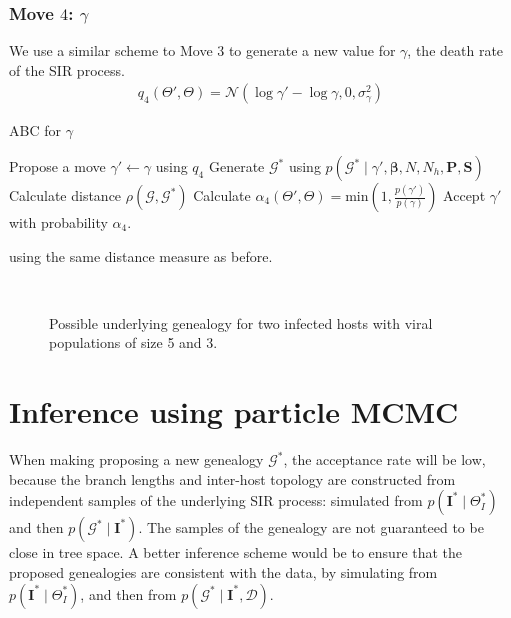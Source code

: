 \documentclass[a4paper,18pt]{report}
\begin{document}
\subsubsection{Move $4$: $\gamma$}
We use a similar scheme to Move $3$ to generate a new value for $\gamma$, the death rate of the SIR process.
\begin{eqnarray}
q_4(\Theta',\Theta)= \mathcal{N}(\log \gamma' - \log \gamma, 0 , \sigma_{\gamma}^2)
\end{eqnarray}
\begin{algorithm}
\caption{ABC for $\gamma$ \label{alg:gamma}}
\begin{algorithmic}
\STATE Propose a move $\gamma'\gets \gamma$ using $q_4$
\STATE Generate $\mathcal{G}^*$ using $p(\mathcal{G}^*\mid \gamma', \boldsymbol{\beta}, N, N_h, \mathbf{P}, \mathbf{S})$
\STATE Calculate distance $\rho(\mathcal{G},\mathcal{G}^*)$
\STATE Calculate $\alpha_{4}(\Theta',\Theta)=\textrm{min}\left(1,\frac{p(\gamma')}{p(\gamma)} \right)$
\STATE Accept $\gamma'$ with probability $\alpha_4$.
\ENDIF
\end{algorithmic}
\end{algorithm}
using the same distance measure as before.





\begin{figure}[h]
\centering
{}\\
\caption{Possible underlying genealogy for two infected hosts with viral populations of size 5 and 3.}
\end{figure}

\section{Inference using particle MCMC}
When making proposing a new genealogy $\mathcal{G}^*$, the acceptance rate will be low, because the branch lengths and inter-host topology are 
constructed from independent samples of the underlying SIR process: simulated from $p(\mathbf{I}^* \mid \Theta_I^*)$ and then $p(\mathcal{G}^* \mid \mathbf{I}^*)$. 
The samples of the genealogy are not guaranteed to be close in tree space. A better inference scheme would be to ensure that the proposed genealogies are consistent with the data,
by simulating from $p(\mathbf{I}^* \mid \Theta_I^*)$, and then from $p(\mathcal{G}^* \mid \mathbf{I}^*, \mathcal{D})$. 
\end{document}
